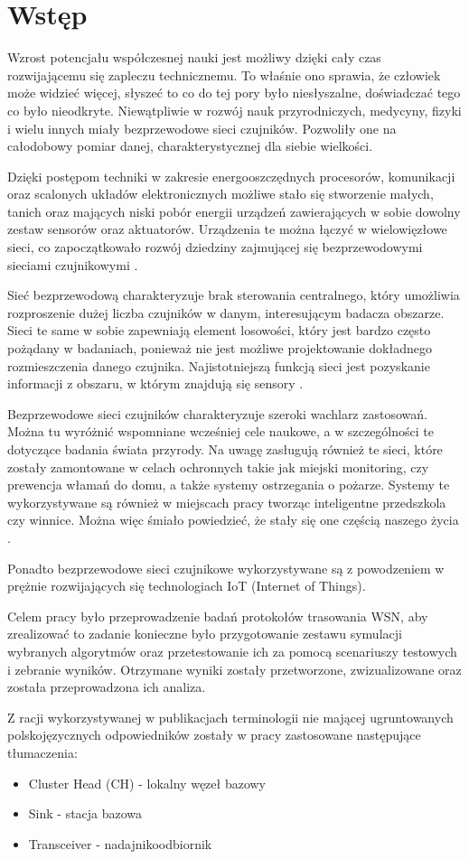 \chapter{Wstęp}
Wzrost potencjału współczesnej nauki jest możliwy dzięki cały czas rozwijającemu się zapleczu technicznemu. To właśnie ono sprawia, że człowiek może widzieć więcej, słyszeć to co do tej pory było niesłyszalne, doświadczać tego co było nieodkryte. Niewątpliwie w rozwój nauk przyrodniczych, medycyny, fizyki i wielu innych miały bezprzewodowe sieci czujników. Pozwoliły one na całodobowy pomiar danej, charakterystycznej dla siebie wielkości.

Dzięki postępom techniki w zakresie energooszczędnych procesorów, komunikacji oraz scalonych układów elektronicznych możliwe stało się stworzenie małych, tanich oraz mających niski pobór energii urządzeń zawierających w sobie dowolny zestaw sensorów oraz aktuatorów. Urządzenia te można łączyć w wielowięzłowe sieci, co zapoczątkowało rozwój dziedziny zajmującej się bezprzewodowymi sieciami czujnikowymi \cite{FahmyIntro2016}. 

Sieć bezprzewodową charakteryzuje brak sterowania centralnego, który umożliwia rozproszenie dużej liczba czujników w danym, interesującym badacza obszarze. Sieci te same w sobie zapewniają element losowości, który jest bardzo często pożądany w badaniach, ponieważ nie jest możliwe projektowanie dokładnego rozmieszczenia danego czujnika. Najistotniejszą funkcją sieci jest pozyskanie informacji z obszaru, w którym znajdują się sensory \cite{Akyildiz2010}.

Bezprzewodowe sieci czujników charakteryzuje szeroki wachlarz zastosowań. Można tu wyróżnić wspomniane wcześniej cele naukowe, a w szczególności te dotyczące badania świata przyrody. Na uwagę zasługują również te sieci, które zostały zamontowane w celach ochronnych takie jak miejski monitoring, czy prewencja włamań do domu, a także systemy ostrzegania o pożarze. Systemy te wykorzystywane są również w miejscach pracy tworząc inteligentne przedszkola czy winnice. Można więc śmiało powiedzieć, że
stały się one częścią naszego życia \cite{Ilyas2004}.

Ponadto bezprzewodowe sieci czujnikowe wykorzystywane są z powodzeniem w prężnie rozwijających się technologiach IoT (Internet of Things). 

Celem pracy było przeprowadzenie badań protokołów trasowania WSN, aby zrealizować to zadanie konieczne było przygotowanie zestawu symulacji wybranych algorytmów oraz przetestowanie ich za pomocą scenariuszy testowych i zebranie wyników. Otrzymane wyniki zostały przetworzone, zwizualizowane oraz została przeprowadzona ich analiza.

Z racji wykorzystywanej w publikacjach terminologii nie mającej ugruntowanych polskojęzycznych odpowiedników zostały w pracy zastosowane następujące tłumaczenia:
\begin{itemize}
\item Cluster Head (CH) - lokalny węzeł bazowy
\item Sink - stacja bazowa
\item Transceiver - nadajnikoodbiornik
\end{itemize}